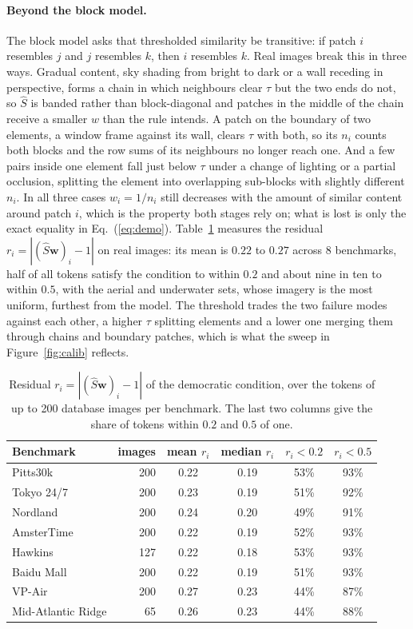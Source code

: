 \paragraph{Beyond the block model.} The block model asks that thresholded similarity be transitive: if patch $i$ resembles $j$ and $j$ resembles $k$, then $i$ resembles $k$. Real images break this in three ways. Gradual content, sky shading from bright to dark or a wall receding in perspective, forms a chain in which neighbours clear $\tau$ but the two ends do not, so $\hat S$ is banded rather than block-diagonal and patches in the middle of the chain receive a smaller $w$ than the rule intends. A patch on the boundary of two elements, a window frame against its wall, clears $\tau$ with both, so its $n_i$ counts both blocks and the row sums of its neighbours no longer reach one. And a few pairs inside one element fall just below $\tau$ under a change of lighting or a partial occlusion, splitting the element into overlapping sub-blocks with slightly different $n_i$. In all three cases $w_i=1/n_i$ still decreases with the amount of similar content around patch $i$, which is the property both stages rely on; what is lost is only the exact equality in Eq.~(\ref{eq:demo}). Table~\ref{tab:residual} measures the residual $r_i=|(\hat S\mathbf w)_i-1|$ on real images: its mean is $0.22$ to $0.27$ across 8 benchmarks, half of all tokens satisfy the condition to within $0.2$ and about nine in ten to within $0.5$, with the aerial and underwater sets, whose imagery is the most uniform, furthest from the model. The threshold trades the two failure modes against each other, a higher $\tau$ splitting elements and a lower one merging them through chains and boundary patches, which is what the sweep in Figure~\ref{fig:calib} reflects.
\begin{table}[H]
\caption{Residual $r_i=|(\hat S\mathbf w)_i-1|$ of the democratic condition, over the tokens of up to 200 database images per benchmark. The last two columns give the share of tokens within $0.2$ and $0.5$ of one.}
\label{tab:residual}
\centering
{\footnotesize\setlength{\tabcolsep}{5pt}%
\begin{tabular}{lrcccc}
\toprule
Benchmark & images & mean $r_i$ & median $r_i$ & $r_i<0.2$ & $r_i<0.5$ \\
\midrule
Pitts30k & 200 & 0.22 & 0.19 & 53\% & 93\% \\
Tokyo 24/7 & 200 & 0.23 & 0.19 & 51\% & 92\% \\
Nordland & 200 & 0.24 & 0.20 & 49\% & 91\% \\
AmsterTime & 200 & 0.22 & 0.19 & 52\% & 93\% \\
Hawkins & 127 & 0.22 & 0.18 & 53\% & 93\% \\
Baidu Mall & 200 & 0.22 & 0.19 & 51\% & 93\% \\
VP-Air & 200 & 0.27 & 0.23 & 44\% & 87\% \\
Mid-Atlantic Ridge & 65 & 0.26 & 0.23 & 44\% & 88\% \\
\bottomrule
\end{tabular}%
}
\end{table}

